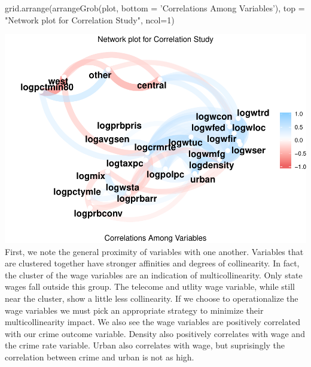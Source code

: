 \documentclass[]{article}
\newenvironment{Shaded}{}{}
\newcommand{\DataTypeTok}[1]{#1}
\newcommand{\DecValTok}[1]{#1}
\newcommand{\KeywordTok}[1]{\textcolor[rgb]{0.00,0.00,1.00}{#1}}
\newcommand{\NormalTok}[1]{#1}
\newcommand{\StringTok}[1]{\textcolor[rgb]{0.00,0.50,0.50}{#1}}
\begin{document}
\begin{Shaded}
\begin{Highlighting}[]
\KeywordTok{grid.arrange}\NormalTok{(}\KeywordTok{arrangeGrob}\NormalTok{(plot, }\DataTypeTok{bottom =} \StringTok{'Correlations Among Variables'}\NormalTok{), }
             \DataTypeTok{top =} \StringTok{"Network plot for Correlation Study"}\NormalTok{, }\DataTypeTok{ncol=}\DecValTok{1}\NormalTok{)}
\end{Highlighting}
\end{Shaded}

\includegraphics{Bagnard_Gaustad_Hartman_Leung_Lab_3_files/figure-latex/unnamed-chunk-55-1.pdf}
First, we note the general proximity of variables with one another.
Variables that are clustered together have stronger affinities and
degrees of collinearity. In fact, the cluster of the wage variables are
an indication of multicollinearity. Only state wages fall outside this
group. The telecome and utlity wage variable, while still near the
cluster, show a little less collinearity. If we choose to operationalize
the wage variables we must pick an appropriate strategy to minimize
their multicollinearity impact. We also see the wage variables are
positively correlated with our crime outcome variable. Density also
positively correlates with wage and the crime rate variable. Urban also
correlates with wage, but suprisingly the correlation between crime and
urban is not as high.
\end{document}
